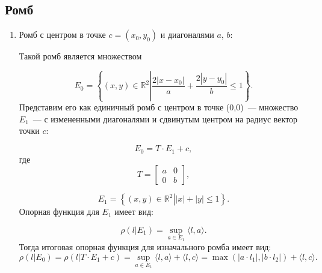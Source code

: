 \documentclass[11pt]{article}
\theoremstyle{definition}
\begin{document}
        \subsection {\bf Ромб} 
        \begin{enumerate}
            \item Ромб с центром в точке $c = (x_0, y_0)$ и диагоналями $a$, $b$: 
            
            Такой ромб является множеством
            
            \[
            E_0 = \left\{(x, y) \in  \mathbb{R}^2 \left| \frac{2|x - x_0|}{a}+\frac{2|y - y_0|}{b}\right. \leqslant 1 \right\}.
            \] 
            Представим его как единичный ромб с центром в точке (0,0)~--- множество $E_1$~--- с измененными диагоналями и сдвинутым центром на радиус вектор точки $c$:
            
            \[
            E_0 = T\cdot  E_1 + c,
            \]
            где 
            \[
            T = \begin{bmatrix} a & 0 \\ 0 & b \end{bmatrix},
            \]
        
            \[
            E_1 = \left\{(x, y) \in \left. \mathbb{R}^2 \right| |x|+|y| \leqslant 1\right\}.
            \] 
            Опорная функция для $E_1$ имеет вид:
            
            \[
            \rho( l \left| E_1\right.) = \sup_{a \in E_1}\langle l, a\rangle.
            \]
            Тогда итоговая опорная функция для изначального ромба имеет вид:
            \begin{equation}\label{eq:ref}
                \rho( l \left| E_0\right.) = \rho( l | T\cdot  E_1 + c) = \sup_{a \in E_1}\langle l, a\rangle + \langle l, c\rangle  = \max(|a\cdot  l_1|, |b\cdot  l_2|) + \langle l, c\rangle. 
            \end{equation}
            
       \end{enumerate}
       
    
\newpage
\end{document}
